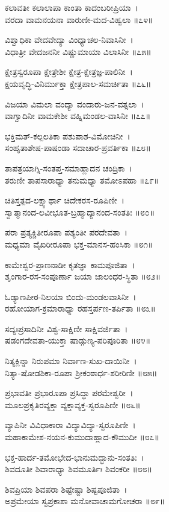 ಕಲಾವತೀ ಕಲಾಲಾಪಾ ಕಾಂತಾ ಕಾದಂಬರೀಪ್ರಿಯಾ~।\\
ವರದಾ ವಾಮನಯನಾ ವಾರುಣೀ-ಮದ-ವಿಹ್ವಲಾ ॥೭೪॥

ವಿಶ್ವಾಧಿಕಾ ವೇದವೇದ್ಯಾ ವಿಂಧ್ಯಾಚಲ-ನಿವಾಸಿನೀ~।\\
ವಿಧಾತ್ರೀ ವೇದಜನನೀ ವಿಷ್ಣುಮಾಯಾ ವಿಲಾಸಿನೀ ॥೭೫॥

ಕ್ಷೇತ್ರಸ್ವರೂಪಾ ಕ್ಷೇತ್ರೇಶೀ ಕ್ಷೇತ್ರ-ಕ್ಷೇತ್ರಜ್ಞ-ಪಾಲಿನೀ~।\\
ಕ್ಷಯವೃದ್ಧಿ-ವಿನಿರ್ಮುಕ್ತಾ ಕ್ಷೇತ್ರಪಾಲ-ಸಮರ್ಚಿತಾ ॥೭೬॥

ವಿಜಯಾ ವಿಮಲಾ ವಂದ್ಯಾ ವಂದಾರು-ಜನ-ವತ್ಸಲಾ~।\\
ವಾಗ್ವಾದಿನೀ ವಾಮಕೇಶೀ ವಹ್ನಿಮಂಡಲ-ವಾಸಿನೀ ॥೭೭॥

ಭಕ್ತಿಮತ್-ಕಲ್ಪಲತಿಕಾ ಪಶುಪಾಶ-ವಿಮೋಚಿನೀ~।\\
ಸಂಹೃತಾಶೇಷ-ಪಾಷಂಡಾ ಸದಾಚಾರ-ಪ್ರವರ್ತಿಕಾ ॥೭೮॥

ತಾಪತ್ರಯಾಗ್ನಿ-ಸಂತಪ್ತ-ಸಮಾಹ್ಲಾದನ ಚಂದ್ರಿಕಾ~।\\
ತರುಣೀ ತಾಪಸಾರಾಧ್ಯಾ ತನುಮಧ್ಯಾ ತಮೋಽಪಹಾ ॥೭೯॥

ಚಿತಿಸ್ತತ್ಪದ-ಲಕ್ಷ್ಯಾರ್ಥಾ ಚಿದೇಕರಸ-ರೂಪಿಣೀ~।\\
ಸ್ವಾತ್ಮಾನಂದ-ಲವೀಭೂತ-ಬ್ರಹ್ಮಾದ್ಯಾನಂದ-ಸಂತತಿಃ ॥೮೦॥

ಪರಾ ಪ್ರತ್ಯಕ್ಚಿತೀರೂಪಾ ಪಶ್ಯಂತೀ ಪರದೇವತಾ~।\\
ಮಧ್ಯಮಾ ವೈಖರೀರೂಪಾ ಭಕ್ತ-ಮಾನಸ-ಹಂಸಿಕಾ ॥೮೧॥

ಕಾಮೇಶ್ವರ-ಪ್ರಾಣನಾಡೀ ಕೃತಜ್ಞಾ ಕಾಮಪೂಜಿತಾ~।\\
ಶೃಂಗಾರ-ರಸ-ಸಂಪೂರ್ಣಾ ಜಯಾ ಜಾಲಂಧರ-ಸ್ಥಿತಾ ॥೮೨॥

ಓಡ್ಯಾಣಪೀಠ-ನಿಲಯಾ ಬಿಂದು-ಮಂಡಲವಾಸಿನೀ~।\\
ರಹೋಯಾಗ-ಕ್ರಮಾರಾಧ್ಯಾ ರಹಸ್ತರ್ಪಣ-ತರ್ಪಿತಾ ॥೮೩॥

ಸದ್ಯಃಪ್ರಸಾದಿನೀ ವಿಶ್ವ-ಸಾಕ್ಷಿಣೀ ಸಾಕ್ಷಿವರ್ಜಿತಾ~।\\
ಷಡಂಗದೇವತಾ-ಯುಕ್ತಾ ಷಾಡ್ಗುಣ್ಯ-ಪರಿಪೂರಿತಾ ॥೮೪॥

ನಿತ್ಯಕ್ಲಿನ್ನಾ ನಿರುಪಮಾ ನಿರ್ವಾಣ-ಸುಖ-ದಾಯಿನೀ~।\\
ನಿತ್ಯಾ-ಷೋಡಶಿಕಾ-ರೂಪಾ ಶ್ರೀಕಂಠಾರ್ಧ-ಶರೀರಿಣೀ ॥೮೫॥

ಪ್ರಭಾವತೀ ಪ್ರಭಾರೂಪಾ ಪ್ರಸಿದ್ಧಾ ಪರಮೇಶ್ವರೀ~।\\
ಮೂಲಪ್ರಕೃತಿರವ್ಯಕ್ತಾ ವ್ಯಕ್ತಾವ್ಯಕ್ತ-ಸ್ವರೂಪಿಣೀ ॥೮೬॥

ವ್ಯಾಪಿನೀ  ವಿವಿಧಾಕಾರಾ ವಿದ್ಯಾವಿದ್ಯಾ-ಸ್ವರೂಪಿಣೀ~।\\
ಮಹಾಕಾಮೇಶ-ನಯನ-ಕುಮುದಾಹ್ಲಾದ-ಕೌಮುದೀ ॥೮೭॥

ಭಕ್ತ-ಹಾರ್ದ-ತಮೋಭೇದ-ಭಾನುಮದ್ಭಾನು-ಸಂತತಿಃ~।\\
ಶಿವದೂತೀ ಶಿವಾರಾಧ್ಯಾ ಶಿವಮೂರ್ತಿಃ ಶಿವಂಕರೀ ॥೮೮॥

ಶಿವಪ್ರಿಯಾ ಶಿವಪರಾ ಶಿಷ್ಟೇಷ್ಟಾ ಶಿಷ್ಟಪೂಜಿತಾ~।\\
ಅಪ್ರಮೇಯಾ ಸ್ವಪ್ರಕಾಶಾ ಮನೋವಾಚಾಮಗೋಚರಾ ॥೮೯॥

